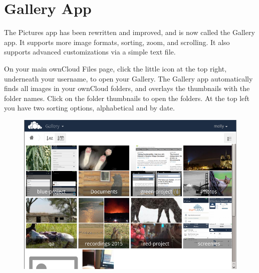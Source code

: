 \documentclass[letterpaper,10pt,english]{sphinxmanual}
\begin{document}
\section{Gallery App}
\label{files/gallery_app:gallery-app}\label{files/gallery_app::doc}
The Pictures app has been rewritten and improved, and is now called the Gallery
app. It supports more image formats, sorting, zoom, and scrolling. It also
supports advanced customizations via a simple text file.

On your main ownCloud Files page, click the little icon at the top right,
underneath your username, to open your Gallery. The Gallery app automatically
finds all images in your ownCloud folders, and overlays the thumbnails with the
folder names. Click on the folder thumbnails to open the folders. At the top
left you have two sorting options, alphabetical and by date.
\begin{figure}[htbp]
\centering

\includegraphics{gallery-1.png}
\end{figure}
\end{document}
